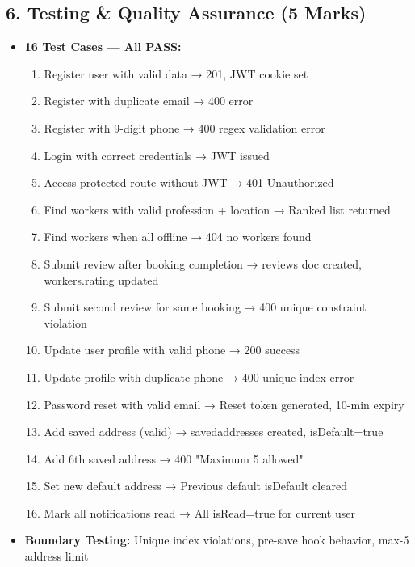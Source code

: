 \documentclass[12pt,a4paper]{article}
\begin{document}
\subsection*{6. Testing \& Quality Assurance (5 Marks)}
\begin{itemize}[leftmargin=*]
    \item \textbf{16 Test Cases — All PASS:}
    \begin{enumerate}[leftmargin=*]
        \item Register user with valid data → 201, JWT cookie set
        \item Register with duplicate email → 400 error
        \item Register with 9-digit phone → 400 regex validation error
        \item Login with correct credentials → JWT issued
        \item Access protected route without JWT → 401 Unauthorized
        \item Find workers with valid profession + location → Ranked list returned
        \item Find workers when all offline → 404 no workers found
        \item Submit review after booking completion → reviews doc created, workers.rating updated
        \item Submit second review for same booking → 400 unique constraint violation
        \item Update user profile with valid phone → 200 success
        \item Update profile with duplicate phone → 400 unique index error
        \item Password reset with valid email → Reset token generated, 10-min expiry
        \item Add saved address (valid) → savedaddresses created, isDefault=true
        \item Add 6th saved address → 400 "Maximum 5 allowed"
        \item Set new default address → Previous default isDefault cleared
        \item Mark all notifications read → All isRead=true for current user
    \end{enumerate}
    \item \textbf{Boundary Testing:} Unique index violations, pre-save hook behavior, max-5 address limit
\end{itemize}
\end{document}
